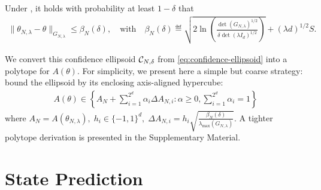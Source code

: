 \documentclass{article}
\begin{document}
\begin{theorem}
\label{thm:confidence_ellipsoid}
Under , it holds with probability at least $1-\delta$ that
\begin{align}
    \label{eq:confidence-ellipsoid}
    \| \theta_{N,\lambda}  - \theta\|_{G_{N,\lambda}} \leq \beta_N(\delta), \quad \text{with}\quad
    \beta_N(\delta)\eqdef \sqrt{2\ln \left(\frac{\det(G_{N,\lambda})^{1/2}}{\delta\det(\lambda I_d)^{1/2}}\right)}
     + (\lambda d)^{1/2}S.
\end{align}
\end{theorem}

We convert this confidence ellipsoid $\mathcal{C}_{N,\delta}$ from \eqref{eq:confidence-ellipsoid} into a polytope for $A(\theta)$. For simplicity, we present here a simple but coarse strategy: bound the ellipsoid by its enclosing axis-aligned hypercube:
\begin{align}
    \label{eq:polytope}
     A(\theta)\in \left\{ A_N +\sum_{i=1}^{2^d}\alpha_{i}\Delta A_{N,i}: \alpha\geq 0,  \sum_{i=1}^{2^d}\alpha_{i}=1\right\}
\end{align}
where $A_N = A(\theta_{N,\lambda}),\; h_i\in\{-1,1\}^d,\; \Delta A_{N,i} = {h_i} \sqrt{\frac{\beta_N(\delta)}{\lambda_{\max}(G_{N,\lambda})}}$. A tighter polytope derivation is presented in the Supplementary Material. %

\section{State Prediction}

\label{sec:prediction}
\end{document}
